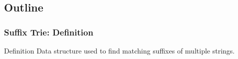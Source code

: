 \documentclass{beamer}
\begin{document}
\subsection{Outline}
\begin{frame}
  \frametitle{Suffix Trie: Definition}

  {\smaller
    \begin{block}{Definition}
      Data structure used to find matching suffixes of multiple strings.
    \end{block}
    
    \vfill

    \begin{center}
    \end{center}
    
    \vfill

}
\end{frame}
\end{document}
